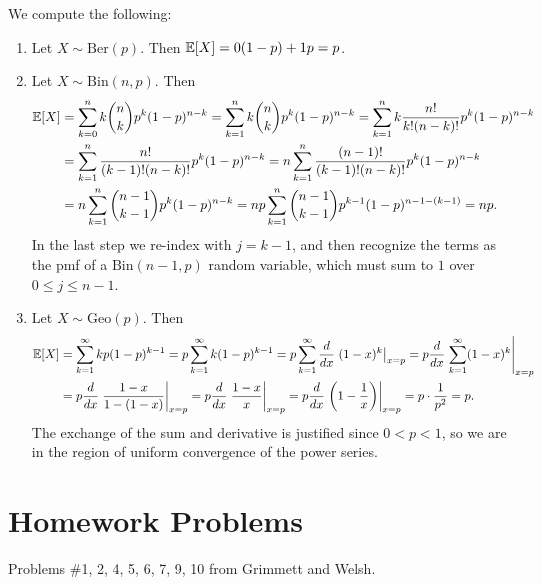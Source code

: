 \begin{example} We compute the following:
  \begin{enumerate}
    \item Let $X \sim \mathrm{Ber}(p)$. Then
      $\mathbb{E}[X] = 0(1 - p) + 1p = p$.
    \item Let $X \sim \mathrm{Bin}(n, p)$. Then
      \begin{align*}
        \mathbb{E}[X]
        &= \sum_{k = 0}^n k \binom{n}{k} p^k (1 - p)^{n - k}
        = \sum_{k = 1}^n k \binom{n}{k} p^k (1 - p)^{n - k}
        = \sum_{k = 1}^n k \frac{n!}{k!(n - k)!} p^k (1 - p)^{n - k} \\
        &= \sum_{k = 1}^n \frac{n!}{(k - 1)!(n - k)!} p^k (1 - p)^{n - k}
        = n \sum_{k = 1}^n \frac{(n - 1)!}{(k - 1)!(n - k)!} p^k (1 - p)^{n - k} \\
        &= n \sum_{k = 1}^n \binom{n - 1}{k - 1} p^k (1 - p)^{n - k}
        = np \sum_{k = 1}^n \binom{n - 1}{k - 1} p^{k - 1} (1 - p)^{n - 1 - (k - 1)} = np.
      \end{align*}
      In the last step we re-index with $j = k - 1$,
      and then recognize the terms as the pmf
      of a $\mathrm{Bin}(n - 1, p)$ random variable,
      which must sum to $1$ over $0 \le j \le n - 1$.
    \item Let $X \sim \mathrm{Geo}(p)$. Then
      \begin{align*}
        \mathbb{E}[X]
        &= \sum_{k = 1}^\infty k p(1 - p)^{k - 1}
        = p \sum_{k = 1}^\infty k(1 - p)^{k - 1}
        = p \sum_{k = 1}^\infty \frac{d}{dx}\left. (1 - x)^k\right|_{x = p}
        = p \frac{d}{dx} \left.\sum_{k = 1}^\infty (1 - x)^k\right|_{x = p} \\
        &= p \frac{d}{dx} \left.\frac{1 - x}{1 - (1 - x)}\right|_{x = p}
        = p \frac{d}{dx} \left.\frac{1 - x}{x}\right|_{x = p}
        = p \frac{d}{dx} \left.\left(1 - \frac{1}{x}\right)\right|_{x = p}
        = p \cdot \frac{1}{p^2} = p.
      \end{align*}
      The exchange of the sum and derivative is
      justified since $0 < p < 1$, so we are in the
      region of uniform convergence of the power
      series.
  \end{enumerate}
\end{example}

\section{Homework Problems}
Problems \#1, 2, 4, 5, 6, 7, 9, 10 from Grimmett and Welsh.
